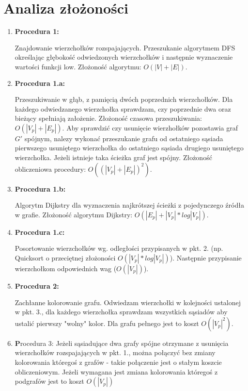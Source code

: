 \documentclass[a4paper]{article}
\begin{document}
	\section{Analiza złożoności}
		\begin{enumerate}
			\item \textbf{Procedura 1: } 
				
				Znajdowanie wierzchołków rozspajających. Przeszukanie algorytmem DFS określając głębokość odwiedzonych wierzchołków i następnie wyznaczenie wartości funkcji low. Złożoność algorytmu: $O(|V|+ |E|)$.

			\item \textbf{Procedura 1.a: }

				Przeszukiwanie w głąb, z pamięcią dwóch poprzednich wierzchołków. Dla każdego odwiedzanego wierzchołka sprawdzam, czy poprzednie dwa oraz bieżący spełniają założenie. Złożoność czasowa przeszukiwania: $O(|V_p| + |E_p|)$. Aby sprawdzić czy usunięcie wierzhołków pozostawia graf $G'$ spójnym, nalezy wykonać przeszukanie grafu od ostatniego sąsiada pierwszego usuniętego wierzchołka do ostatniego sąsiada drugiego usuniętego wierzchołka. Jeżeli istnieje taka ścieżka graf jest spójny. Złożoność obliczeniowa procedury: $O((|V_p| + |E_p|)^2)$.

			\item \textbf{Procedura 1.b: }

				Algorytm Dijkstry dla wyznaczenia najkrótszej ścieżki z pojedynczego źródła w grafie. Złożoność algorytmu Dijkstry: $O(|E_p| + |V_p| * log|V_p|)$.

			\item \textbf{Procedura 1.c: }

				Posortowanie wierzchołków wg. odległości przypisanych w pkt. 2. (np. Quicksort o przeciętnej złożoności $O(|V_p|*log|V_p|)$). Następnie przypisanie wierzchołkom odpowiednich wag ($O(|V_p|)$).

			\item \textbf{Procedura 2: }

				Zachłanne kolorowanie grafu. Odwiedzam wierzchołki w kolejności ustalonej w pkt. 3., dla każdego wierzchołka sprawdzam wszystkich sąsiadów aby ustalić pierwszy "wolny" kolor. Dla grafu pełnego jest to koszt $O(|V_p|^2)$.

			\item {\textbf Procedura 3:}
				Jeżeli sąsiadujące dwa grafy spójne otrzymane z usunięcia wierzchołków rozspajających w pkt. 1., można połączyć bez zmiany kolorowania któregoś z grafów - takie połączenie jest o stałym koszcie obliczeniowym. Jeżeli wymagana jest zmiana kolorowania któregoś z podgrafów jest to koszt $O(|V_p|)$


		\end{enumerate}
\end{document}
